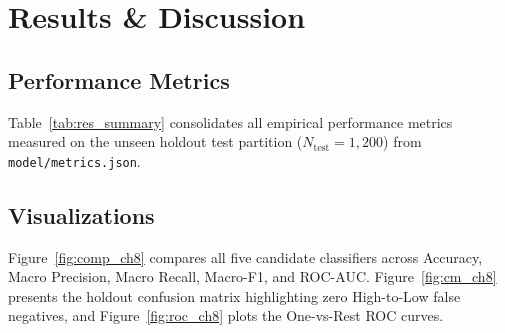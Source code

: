 \documentclass[12pt,a4paper]{report}
\begin{document}
\chapter{Results \& Discussion}

\section{Performance Metrics}
Table~\ref{tab:res_summary} consolidates all empirical performance metrics measured on the unseen holdout test partition ($N_{\text{test}} = 1{,}200$) from \texttt{model/metrics.json}.

\begin{table}[htbp]
\centering
\caption{Summary of XGBoost champion performance and system verification}
\label{tab:res_summary}
\end{table}

\section{Visualizations}
Figure~\ref{fig:comp_ch8} compares all five candidate classifiers across Accuracy, Macro Precision, Macro Recall, Macro-F1, and ROC-AUC. Figure~\ref{fig:cm_ch8} presents the holdout confusion matrix highlighting zero High-to-Low false negatives, and Figure~\ref{fig:roc_ch8} plots the One-vs-Rest ROC curves.
\end{document}
